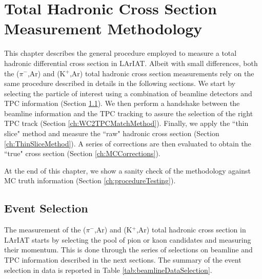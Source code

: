 \chapter{Total Hadronic Cross Section Measurement Methodology}\label{ch:Interactions}
This chapter describes the general procedure employed to measure a total hadronic differential cross section in LArIAT.
Albeit with small differences, both the  ($\pi^{-}$,Ar) and (K$^{+}$,Ar) total hadronic cross section measurements rely on the same procedure described in details in the following sections. We start by selecting the particle of interest using a combination of beamline detectors and TPC information (Section \ref{ch:ParticleSelectionMethod}). We then perform a handshake between the beamline information and the TPC tracking to assure the selection of the right TPC track (Section \ref{ch:WC2TPCMatchMethod}). Finally, we apply the ``thin slice" method and measure the ``raw" hadronic cross section (Section \ref{ch:ThinSliceMethod}). A series of corrections are then evaluated to obtain the ``true" cross section (Section \ref{ch:MCCorrections}). 

At the end of this chapter, we show a sanity check of the methodology against MC truth information (Section \ref{ch:procedureTesting}).



\section{Event Selection}\label{ch:ParticleSelectionMethod}
The measurement of the ($\pi^{-}$,Ar) and (K$^{+}$,Ar) total hadronic cross section in LArIAT starts by selecting the pool of pion or kaon candidates and measuring their momentum.  This is done through the series of selections on  beamline and TPC information described in the next sections. The summary of the event selection in data is reported in Table \ref{tab:beamlineDataSelection}.


